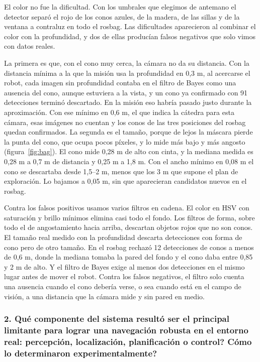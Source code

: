 El color no fue la dificultad. Con los umbrales que elegimos de antemano el
detector separó el rojo de los conos azules, de la madera, de las sillas y de
la ventana a contraluz en todo el rosbag. Las dificultades aparecieron al
combinar el color con la profundidad, y dos de ellas producían falsos
negativos que solo vimos con datos reales.

La primera es que, con el cono muy cerca, la cámara no da su distancia. Con la
distancia mínima a la que la misión usa la profundidad en 0,3 m, al acercarse
el robot, cada imagen sin profundidad contaba
en el filtro de Bayes como una ausencia del cono, aunque estuviera a la vista,
y un cono ya confirmado con 91 detecciones terminó descartado. En la misión eso habría
pasado justo durante la aproximación. Con ese mínimo en 0,6 m, el que indica la
cátedra para esta cámara, esas imágenes no cuentan y los conos de las tres
posiciones del rosbag quedan confirmados. La segunda es el
tamaño, porque de lejos la máscara pierde la punta del cono, que ocupa pocos
píxeles, y lo mide más bajo y más angosto (figura~\ref{fig:bag}). El cono
mide 0,28 m de alto con cinta, y la mediana medida es 0,28 m a 0,7 m de
distancia y 0,25 m a 1,8 m. Con el ancho mínimo en 0,08 m el cono se
descartaba desde 1,5--2 m, menos que los 3 m que supone el plan de
exploración. Lo bajamos a 0,05 m, sin que aparecieran candidatos nuevos en el
rosbag.

Contra los falsos positivos usamos varios filtros en cadena. El color en HSV con
saturación y brillo mínimos elimina casi todo el fondo. Los filtros de forma,
sobre todo el de angostamiento hacia arriba, descartan objetos rojos que no
son conos. El
tamaño real medido con la profundidad descarta detecciones con forma de cono pero
de otro tamaño. En el rosbag rechazó 12 detecciones de conos a menos de
0,6 m, donde la mediana tomaba la pared del fondo y el cono daba entre 0,85 y
2 m de alto. Y el filtro de Bayes exige al menos dos detecciones en el mismo
lugar antes de mover el robot. Contra los falsos negativos, el filtro solo
cuenta una ausencia cuando el cono debería verse, o sea cuando está en el campo
de visión, a una distancia que la cámara mide y sin pared en medio.

\subsubsection*{2. \textquestiondown{}Qué componente del sistema resultó ser el principal limitante para lograr una navegación robusta en el entorno real: percepción, localización, planificación o control? \textquestiondown{}Cómo lo determinaron experimentalmente?}

